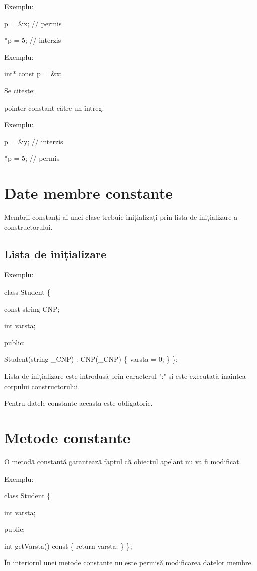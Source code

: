 \documentclass[12pt,a4paper]{article}
\begin{document}
Exemplu:

p = \&x;      // permis

*p = 5;      // interzis

Exemplu:

int* const p = \&x;

Se citește:

pointer constant către un întreg.

Exemplu:

p = \&y;      // interzis

*p = 5;      // permis

\section{Date membre constante}

Membrii constanți ai unei clase trebuie inițializați prin lista de inițializare a constructorului.

\subsection{Lista de inițializare}

Exemplu:

class Student \{

    const string CNP;

    int varsta;

public:

    Student(string \_CNP)
        : CNP(\_CNP)
    \{
        varsta = 0;
    \}
\};

Lista de inițializare este introdusă prin caracterul ":" și este executată înaintea corpului constructorului.

Pentru datele constante aceasta este obligatorie.

\section{Metode constante}

O metodă constantă garantează faptul că obiectul apelant nu va fi modificat.

Exemplu:

class Student \{

    int varsta;

public:

    int getVarsta() const \{
        return varsta;
    \}
\};

În interiorul unei metode constante nu este permisă modificarea datelor membre.
\end{document}
